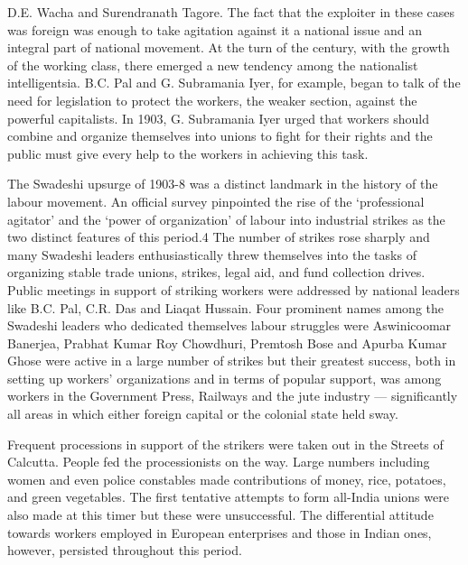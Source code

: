 D.E. Wacha and Surendranath Tagore. The fact that the exploiter in these cases was foreign was enough to take agitation against it a national issue and an integral part of national movement. At the turn of the century, with the growth of the working class, there emerged a new tendency among the nationalist intelligentsia. B.C. Pal and G. Subramania Iyer, for example, began to talk of the need for legislation to protect the workers, the weaker section, against the powerful capitalists. In 1903, G. Subramania Iyer urged that workers should combine and organize themselves into unions to fight for their rights and the public must give every help to the workers in achieving this task.

The Swadeshi upsurge of 1903-8 was a distinct landmark in the history of the labour movement. An official survey pinpointed the rise of the `professional agitator' and the `power of organization' of labour into industrial strikes as the two distinct features of this period.4 The number of strikes rose sharply and many Swadeshi leaders enthusiastically threw themselves into the tasks of organizing stable trade unions, strikes, legal aid, and fund collection drives. Public meetings in support of striking workers were addressed by national leaders like B.C. Pal, C.R. Das and Liaqat Hussain. Four prominent names among the Swadeshi leaders who dedicated themselves labour struggles were Aswinicoomar Banerjea, Prabhat Kumar Roy Chowdhuri, Premtosh Bose and Apurba Kumar Ghose were active in a large number of strikes but their greatest success, both in setting up workers' organizations and in terms of popular support, was among workers in the Government Press, Railways and the jute industry — significantly all areas in which either foreign capital or the colonial state held sway.

Frequent processions in support of the strikers were taken out in the Streets of Calcutta. People fed the processionists on the way. Large numbers including women and even police constables made contributions of money, rice, potatoes, and green vegetables. The first tentative attempts to form all-India unions were also made at this timer but these were unsuccessful. The differential attitude towards workers employed in European enterprises and those in Indian ones, however, persisted throughout this period.

